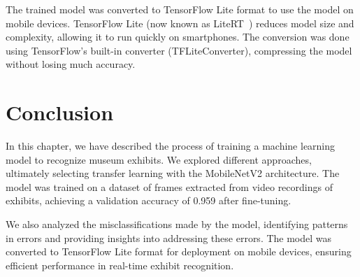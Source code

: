 The trained model was converted to TensorFlow Lite format to use the model on mobile devices. TensorFlow Lite (now known as LiteRT~\cite{tensorflow_lite}) reduces model size and complexity, allowing it to run quickly on smartphones. The conversion was done using TensorFlow's built-in converter (TFLiteConverter), compressing the model without losing much accuracy.

\section{Conclusion}

In this chapter, we have described the process of training a machine learning model to recognize museum exhibits. We explored different approaches, ultimately selecting transfer learning with the MobileNetV2 architecture. The model was trained on a dataset of frames extracted from video recordings of exhibits, achieving a validation accuracy of 0.959 after fine-tuning.

We also analyzed the misclassifications made by the model, identifying patterns in errors and providing insights into addressing these errors. The model was converted to TensorFlow Lite format for deployment on mobile devices, ensuring efficient performance in real-time exhibit recognition.